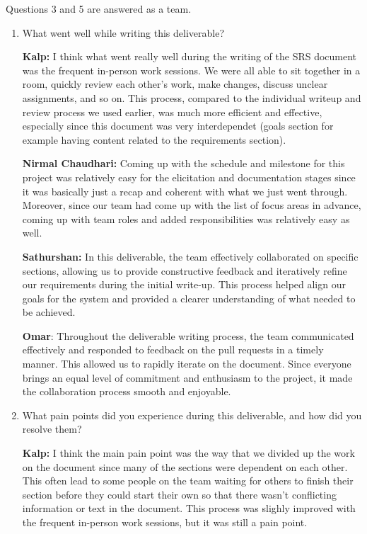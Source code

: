 Questions 3 and 5 are answered as a team.

\begin{enumerate}
  \item What went well while writing this deliverable? 

  \textbf{Kalp:} I think what went really well during the writing of the SRS
  document was the frequent in-person work sessions. We were all able to sit 
  together in a room, quickly review each other's work, make changes, discuss 
  unclear assignments, and so on. This process, compared to the individual 
  writeup and review process we used earlier, was much more efficient and 
  effective, especially since this document was very interdependet (goals
  section for example having content related to the requirements section).
  
  \textbf{Nirmal Chaudhari:} Coming up with the schedule and milestone for this
  project was relatively easy for the elicitation and documentation stages 
  since it was basically just a recap and coherent with what we just went 
  through. Moreover, since our team had come up with the list of focus areas 
  in advance, coming up with team roles and added responsibilities was 
  relatively easy as well. 
  
  \textbf{Sathurshan:} In this deliverable, the team effectively collaborated on
  specific sections, allowing us to provide constructive feedback and
  iteratively refine our requirements during the initial write-up. This process
  helped align our goals for the system and provided a clearer understanding of
  what needed to be achieved.

  \textbf{Omar}: Throughout the deliverable writing process, the team communicated
  effectively and responded to feedback on the pull requests in a timely manner. 
  This allowed us to rapidly iterate on the document. Since everyone brings 
  an equal level of commitment and enthusiasm to the project, it made the 
  collaboration process smooth and enjoyable.

  \item What pain points did you experience during this deliverable, and how did
  you resolve them?

  \textbf{Kalp:} I think the main pain point was the way that we divided up the 
  work on the document since many of the sections were dependent on each other.
  This often lead to some people on the team waiting for others to finish their
  section before they could start their own so that there wasn't conflicting
  information or text in the document. This process was slighly improved with 
  the frequent in-person work sessions, but it was still a pain point.
  

\end{enumerate}
